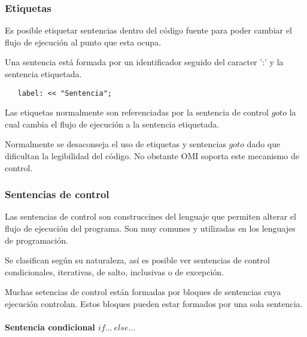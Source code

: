 \subsubsection{Etiquetas} \label{sec:label}
Es posible etiquetar sentencias dentro del código fuente para poder cambiar el flujo de ejecución al punto que esta ocupa.

Una sentencia está formada por un identificador seguido del caracter ':' y la sentencia etiquetada.

\begin{lstlisting}
   label: << "Sentencia";
\end{lstlisting}

Las etiquetas normalmente son referenciadas por la sentencia de control $goto$ la cual cambia el flujo de ejecución 
a la sentencia etiquetada. 

Normalmente se desaconseja el uso de etiquetas y sentencias $goto$ dado que dificultan la legibilidad del código. No obstante OMI 
soporta este mecanismo de control.




\subsubsection{Sentencias de control}

Las sentencias de control son construccines del lenguaje que permiten alterar el flujo de ejecución del programa. Son muy comunes y
utilizadas en los lenguajes de programación.

Se clasifican según su naturaleza, así es posible ver sentencias de control condicionales, iterativas, de salto, inclusivas o de excepción.

Muchas setencias de control están formadas por bloques de sentencias cuya ejecución controlan. Estos bloques pueden estar formados por una sola sentencia.



\paragraph{Sentencia condicional $if...\ else...$}\label{sec:stmt_if}

